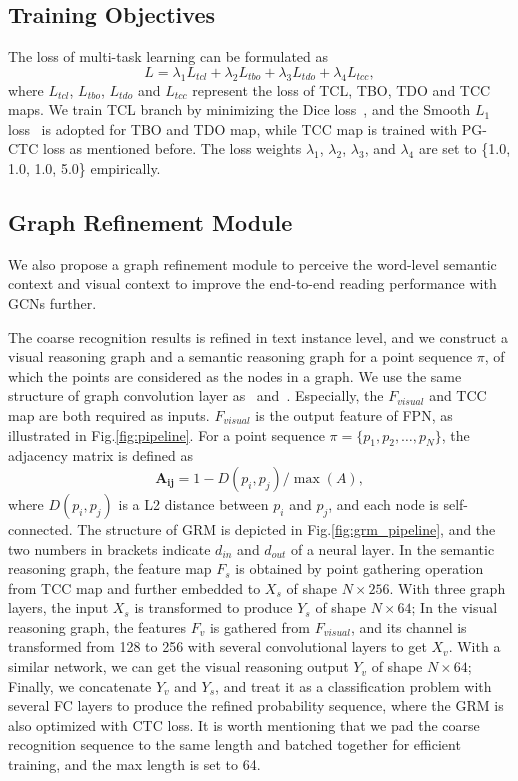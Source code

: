 \documentclass[letterpaper]{article} \usepackage{aaai21}  \usepackage{times}  \usepackage{helvet} \usepackage{courier}  \usepackage[hyphens]{url}  \usepackage{graphicx} \urlstyle{rm} \def\UrlFont{\rm}  \usepackage{natbib}  \usepackage{caption} \usepackage{bm}
\begin{document}
\subsection{Training Objectives}
The loss of multi-task learning can be formulated as
\begin{equation}
L = {\lambda}_1 L_{tcl} + {\lambda}_2 L_{tbo} + {\lambda}_3 L_{tdo} +{\lambda}_4 L_{tcc},
\end{equation}
where $L_{tcl}$, $L_{tbo}$, $L_{tdo}$ and $L_{tcc}$ represent the loss of TCL, TBO, TDO and TCC maps. We train TCL branch by minimizing the Dice loss~\cite{milletari2016v}, and the Smooth $L_1$ loss~\cite{fastrcnn} is adopted for TBO and TDO map, while TCC map is trained with PG-CTC loss as mentioned before. The loss weights ${\lambda}_1$, ${\lambda}_2$, ${\lambda}_3$, and ${\lambda}_4$ are set to \{1.0, 1.0, 1.0, 5.0\} empirically.


\subsection{Graph Refinement Module}
We also propose a graph refinement module to perceive the word-level semantic context and visual context to improve the end-to-end reading performance with GCNs further. 

The coarse recognition results is refined in text instance level, and we construct a visual reasoning graph and a semantic reasoning graph for a point sequence $\pi$, of which the points are considered as the nodes in a graph. We use the same structure of graph convolution layer as~\cite{wang2019gncclust} and~\cite{zhang2020det}. Especially, the $F_{visual}$ and TCC map are both required as inputs. $F_{visual}$ is the output feature of FPN, as illustrated in Fig.\ref{fig:pipeline}. For a point sequence $\pi = \{ p_1, p_2, \dots, p_N \}$, the adjacency matrix is defined as
\begin{equation}
    \bm{A_{ij}}=1 - D(p_i, p_j) / \max(A),
\end{equation}
where $D(p_i, p_j)$ is a L2 distance between $p_i$ and $p_j$, and each node is self-connected. 
The structure of GRM is depicted in Fig.\ref{fig:grm_pipeline}, and the two numbers in brackets indicate $d_{in}$ and $d_{out}$ of a neural layer. In the semantic reasoning graph, the feature map $F_{s}$ is obtained by point gathering operation from TCC map and further embedded to $X_{s}$ of shape $N \times 256$. With three graph layers, the input ${X_{s}}$ is transformed to produce ${Y_{s}}$ of shape $N \times 64$; In the visual reasoning graph, the features $F_{v}$ is gathered from $F_{visual}$, and its channel is transformed from 128 to 256 with several convolutional layers to get $X_{v}$. With a similar network, we can get the visual reasoning output ${Y_{v}}$ of shape $N\times 64$; Finally, we concatenate ${Y_{v}}$ and ${Y_{s}}$, and treat it as a classification problem with several FC layers to produce the refined probability sequence, where the GRM is also optimized with CTC loss. It is worth mentioning that we pad the coarse recognition sequence to the same length and batched together for efficient training, and the max length is set to 64. 
\end{document}
